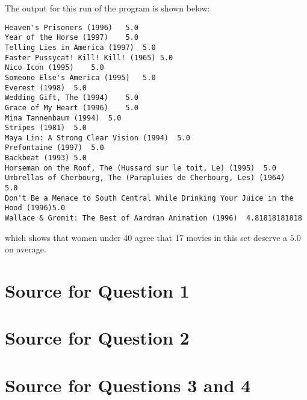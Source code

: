 \documentclass[letterpaper,11pt]{article}
\begin{document}
\newpage
The output for this run of the program is shown below:
\begin{lstlisting}[frame=single]
Heaven's Prisoners (1996)	5.0
Year of the Horse (1997)	5.0
Telling Lies in America (1997)	5.0
Faster Pussycat! Kill! Kill! (1965)	5.0
Nico Icon (1995)	5.0
Someone Else's America (1995)	5.0
Everest (1998)	5.0
Wedding Gift, The (1994)	5.0
Grace of My Heart (1996)	5.0
Mina Tannenbaum (1994)	5.0
Stripes (1981)	5.0
Maya Lin: A Strong Clear Vision (1994)	5.0
Prefontaine (1997)	5.0
Backbeat (1993)	5.0
Horseman on the Roof, The (Hussard sur le toit, Le) (1995)	5.0
Umbrellas of Cherbourg, The (Parapluies de Cherbourg, Les) (1964)	5.0
Don't Be a Menace to South Central While Drinking Your Juice in the Hood (1996)5.0
Wallace & Gromit: The Best of Aardman Animation (1996)	4.81818181818
\end{lstlisting}
which shows that women under 40 agree that 17 movies in this set deserve a $5.0$ on average.

\clearpage
\appendix
\section{Source for Question 1}



\clearpage
\appendix
\section{Source for Question 2}



\clearpage
\appendix
\section{Source for Questions 3 and 4}


\end{document}
